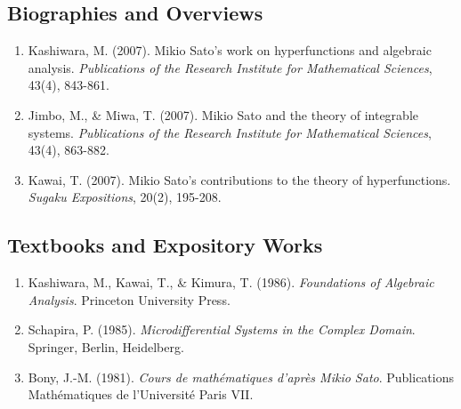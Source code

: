 \subsection*{Biographies and Overviews}
\begin{enumerate}
    \item Kashiwara, M. (2007). Mikio Sato's work on hyperfunctions and algebraic analysis. \textit{Publications of the Research Institute for Mathematical Sciences}, 43(4), 843-861.
    \item Jimbo, M., \& Miwa, T. (2007). Mikio Sato and the theory of integrable systems. \textit{Publications of the Research Institute for Mathematical Sciences}, 43(4), 863-882.
    \item Kawai, T. (2007). Mikio Sato's contributions to the theory of hyperfunctions. \textit{Sugaku Expositions}, 20(2), 195-208.
\end{enumerate}

\subsection*{Textbooks and Expository Works}
\begin{enumerate}
    \item Kashiwara, M., Kawai, T., \& Kimura, T. (1986). \textit{Foundations of Algebraic Analysis}. Princeton University Press.
    \item Schapira, P. (1985). \textit{Microdifferential Systems in the Complex Domain}. Springer, Berlin, Heidelberg.
    \item Bony, J.-M. (1981). \textit{Cours de mathématiques d'après Mikio Sato}. Publications Mathématiques de l'Université Paris VII.
\end{enumerate}
